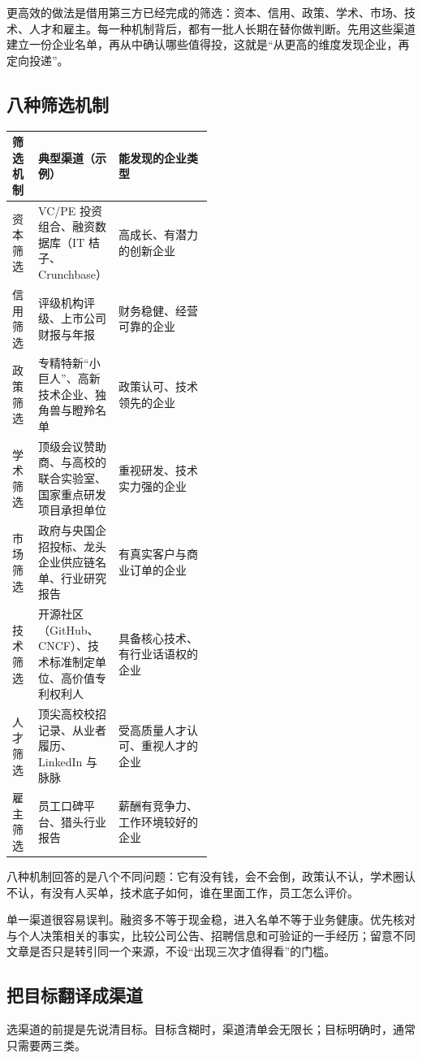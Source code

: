 \documentclass[UTF8,zihao=5,openany]{ctexbook}
\begin{document}
更高效的做法是借用第三方已经完成的筛选：资本、信用、政策、学术、市场、技术、人才和雇主。每一种机制背后，都有一批人长期在替你做判断。先用这些渠道建立一份企业名单，再从中确认哪些值得投，这就是“从更高的维度发现企业，再定向投递”。

\subsection{八种筛选机制}
\begin{center}\small
\begin{tabularx}{\linewidth}{p{0.13\linewidth}p{0.36\linewidth}Y}
\toprule
筛选机制 & 典型渠道（示例） & 能发现的企业类型 \\
\midrule
资本筛选 & VC/PE 投资组合、融资数据库（IT 桔子、Crunchbase） & 高成长、有潜力的创新企业 \\
信用筛选 & 评级机构评级、上市公司财报与年报 & 财务稳健、经营可靠的企业 \\
政策筛选 & 专精特新“小巨人”、高新技术企业、独角兽与瞪羚名单 & 政策认可、技术领先的企业 \\
学术筛选 & 顶级会议赞助商、与高校的联合实验室、国家重点研发项目承担单位 & 重视研发、技术实力强的企业 \\
市场筛选 & 政府与央国企招投标、龙头企业供应链名单、行业研究报告 & 有真实客户与商业订单的企业 \\
技术筛选 & 开源社区（GitHub、CNCF）、技术标准制定单位、高价值专利权利人 & 具备核心技术、有行业话语权的企业 \\
人才筛选 & 顶尖高校校招记录、从业者履历、LinkedIn 与脉脉 & 受高质量人才认可、重视人才的企业 \\
雇主筛选 & 员工口碑平台、猎头行业报告 & 薪酬有竞争力、工作环境较好的企业 \\
\bottomrule
\end{tabularx}
\end{center}

八种机制回答的是八个不同问题：它有没有钱，会不会倒，政策认不认，学术圈认不认，有没有人买单，技术底子如何，谁在里面工作，员工怎么评价。

单一渠道很容易误判。融资多不等于现金稳，进入名单不等于业务健康。优先核对与个人决策相关的事实，比较公司公告、招聘信息和可验证的一手经历；留意不同文章是否只是转引同一个来源，不设“出现三次才值得看”的门槛。

\subsection{把目标翻译成渠道}
选渠道的前提是先说清目标。目标含糊时，渠道清单会无限长；目标明确时，通常只需要两三类。
\end{document}
